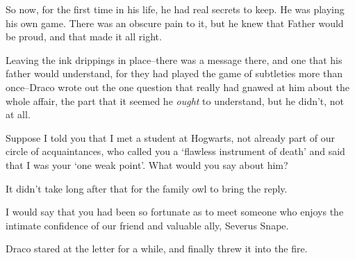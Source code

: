 So now, for the first time in his life, he had real secrets to keep. He was playing his own game. There was an obscure pain to it, but he knew that Father would be proud, and that made it all right.

Leaving the ink drippings in place\---there was a message there, and one that his father would understand, for they had played the game of subtleties more than once\---Draco wrote out the one question that really had gnawed at him about the whole affair, the part that it seemed he \emph{ought} to understand, but he didn't, not at all.

\begin{writtenNote}

Suppose I told you that I met a student at Hogwarts, not already part of our circle of acquaintances, who called you a `flawless instrument of death' and said that I was your `one weak point'. What would you say about him?

\end{writtenNote}

It didn't take long after that for the family owl to bring the reply.

\begin{writtenNote}

I would say that you had been so fortunate as to meet someone who enjoys the intimate confidence of our friend and valuable ally, Severus Snape.

\end{writtenNote}

Draco stared at the letter for a while, and finally threw it into the fire.

